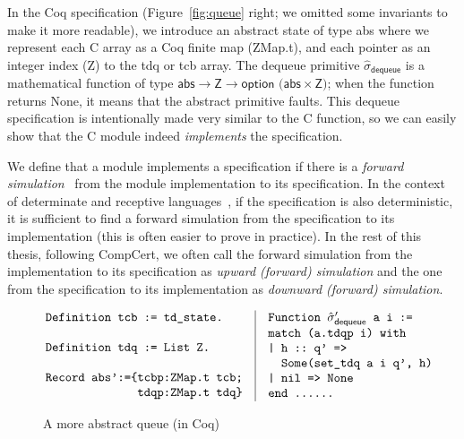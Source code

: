 In the Coq specification (Figure~\ref{fig:queue} right; we omitted some
invariants to make it more readable), we introduce an abstract state
of type \textsf{abs} where we represent each C array as a Coq finite map
(\textsf{ZMap.t}), and each pointer as an integer index (\textsf{Z}) to the
\textsf{tdq} or \textsf{tcb} array. The \textsf{dequeue} primitive 
$\hat{\sigma}_\textsf{dequeue}$ is
a mathematical function of type $\textsf{abs} \rightarrow \textsf{Z}
\rightarrow \textsf{option (abs}\times \textsf{Z)}$; when the function returns
\textsf{None}, it means that the abstract primitive faults.  This
\textsf{dequeue} specification is intentionally made very similar to the C
function, so we can easily show that the C module indeed {\em
  implements} the specification. 

We define that a module implements a specification if there is a
{\em forward simulation}~\cite{Lynch95} from the module implementation to its
specification. In the context of determinate and receptive 
languages~\cite{sevcik13,Leroy-backend},
if the specification is also deterministic, it is sufficient to find
a forward simulation from the specification to its
implementation (this is often easier to prove in practice). 
In the rest of this thesis, following CompCert, we often call the
forward simulation from the implementation to its specification
as {\em upward (forward) simulation} and the one from the specification
to its implementation as {\em downward (forward) simulation}.


\begin{figure}[t]\scriptsize
$$
\begin{array}{l|l}
\hspace*{-2ex} 
\begin{array}[t]{l}
\verb+Definition tcb := td_state.+\\
\verb++\\
\verb+Definition tdq := List Z.+\\
\verb++\\
\verb+Record abs':={tcbp:ZMap.t tcb;+\\
\verb+              tdqp:ZMap.t tdq}+\\
\end{array}
&
\begin{array}[t]{l}
\verb+Function + \hat{\sigma}_\textsf{dequeue}' \verb+ a i :=+\\ 
\verb+match (a.tdqp i) with+\\
\verb+| h :: q' =>+\\
\verb+  Some(set_tdq a i q', h)+\\
\verb+| nil => None+\\
\verb+end ......+\\
\end{array}
\end{array}
$$ 
\caption{A more abstract queue (in Coq)}
\label{fig:queue2}
\end{figure}

